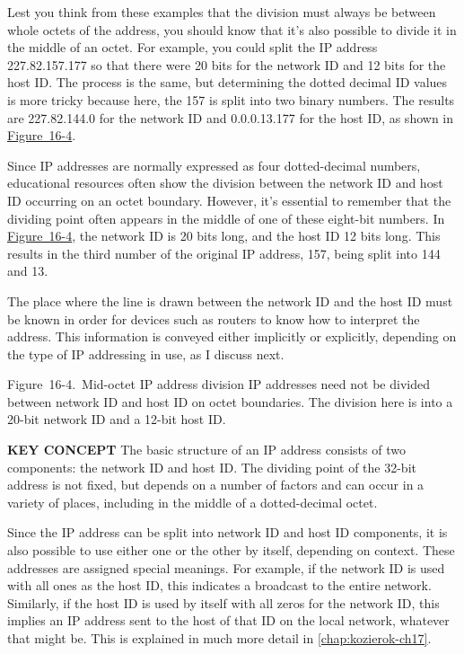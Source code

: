 \documentclass[b5paper,11pt]{memoir}
\begin{document}
Lest you think from these examples that the
\protect\hypertarget{ch16s03.htmlux5cux23idx-CHP-16-0663}{}{}division
must always be between whole octets of the address, you should know that
it's also possible to divide it in the middle of an octet. For example,
you could split the IP address 227.82.157.177 so that there were 20 bits
for the network ID and 12 bits for the host ID. The process is the same,
but determining the dotted decimal ID values is more tricky because
here, the 157 is split into two binary numbers. The results are
227.82.144.0 for the network ID and 0.0.0.13.177 for the host ID, as
shown in
\protect\hyperlink{ch16s03.htmlux5cux23mid-octet_ip_address_division_ip_address}{Figure~16-4}.

Since IP addresses are normally expressed as four dotted-decimal
numbers, educational resources often show the division between the
network ID and host ID occurring on an octet boundary. However, it's
essential to remember that the dividing point often appears in the
middle of one of these eight-bit numbers. In
\protect\hyperlink{ch16s03.htmlux5cux23mid-octet_ip_address_division_ip_address}{Figure~16-4},
the network ID is 20 bits long, and the host ID 12 bits long. This
results in the third number of the original IP address, 157, being split
into 144 and 13.

The place where the line is drawn between the network ID and the host ID
must be known in order for devices such as routers to know how to
interpret the address. This information is conveyed either implicitly or
explicitly, depending on the type of IP addressing in use, as I discuss
next.

\protect\hypertarget{ch16s03.htmlux5cux23mid-octet_ip_address_division_ip_address}{}{}

\protect\hypertarget{ch16s03.htmlux5cux23I_mediaobject2_d1e16127}{}{}

Figure~16-4.~Mid-octet IP address division IP addresses need not be
divided between network ID and host ID on octet boundaries. The division
here is into a 20-bit network ID and a 12-bit host ID.


{\textbf{KEY CONCEPT}} The basic structure of an IP address consists of
two components: the network ID and host ID. The dividing point of the
32-bit address is not fixed, but depends on a number of factors and can
occur in a variety of places, including in the middle of a
dotted-decimal octet.

Since the IP address can be split into network ID and host ID
components, it is also possible to use either one or the other by
itself, depending on context. These addresses are assigned special
meanings. For example, if the network ID is used with all ones as the
host ID, this indicates a broadcast to the entire network. Similarly, if
the host ID is used by itself with all zeros for the network ID, this
implies an IP address sent to the host of that ID on the local network,
whatever that might be.
This is explained in much more detail in \vref{chap:kozierok-ch17}.
\end{document}
